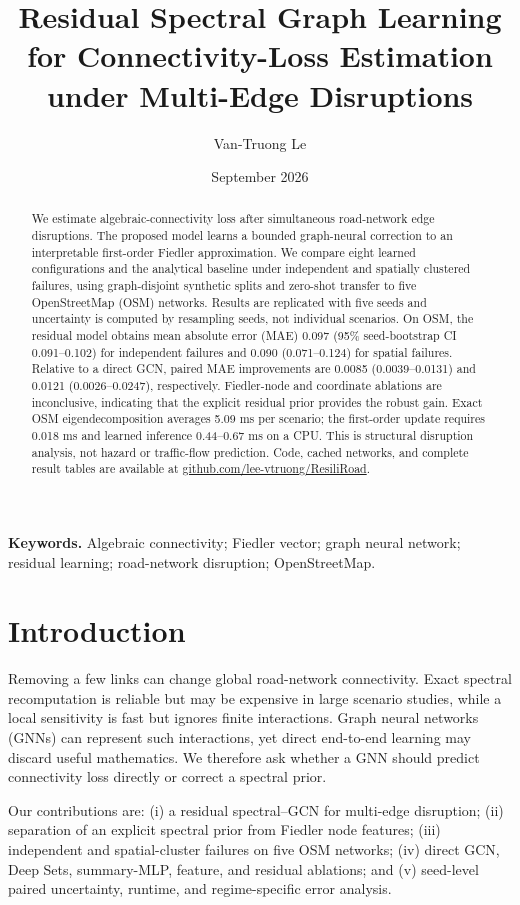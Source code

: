 \documentclass[11pt]{amsart}
\title[Residual spectral graph learning]{Residual Spectral Graph Learning for Connectivity-Loss Estimation under Multi-Edge Disruptions}
\author{Van-Truong Le}
\date{September 2026}
\begin{document}
\begin{abstract}
We estimate algebraic-connectivity loss after simultaneous road-network edge
disruptions. The proposed model learns a bounded graph-neural correction to an
interpretable first-order Fiedler approximation. We compare eight learned
configurations and the analytical baseline under independent and spatially
clustered failures, using graph-disjoint synthetic splits and zero-shot transfer
to five OpenStreetMap (OSM) networks. Results are replicated with five seeds and
uncertainty is computed by resampling seeds, not individual scenarios. On OSM,
the residual model obtains mean absolute error (MAE) 0.097 (95\% seed-bootstrap
CI 0.091--0.102) for independent failures and 0.090 (0.071--0.124) for spatial
failures. Relative to a direct GCN, paired MAE improvements are 0.0085
(0.0039--0.0131) and 0.0121 (0.0026--0.0247), respectively. Fiedler-node and
coordinate ablations are inconclusive, indicating that the explicit residual
prior provides the robust gain. Exact OSM eigendecomposition averages 5.09 ms
per scenario; the first-order update requires 0.018 ms and learned inference
0.44--0.67 ms on a CPU. This is structural disruption analysis, not hazard or
traffic-flow prediction.
Code, cached networks, and complete result tables are available at
\href{https://github.com/lee-vtruong/ResiliRoad}{github.com/lee-vtruong/ResiliRoad}.
\end{abstract}
\maketitle
\noindent\textbf{Keywords.} Algebraic connectivity; Fiedler vector; graph neural
network; residual learning; road-network disruption; OpenStreetMap.
\vspace{1.1em}

\section{Introduction}
Removing a few links can change global road-network connectivity. Exact
spectral recomputation is reliable but may be expensive in large scenario
studies, while a local sensitivity is fast but ignores finite interactions.
Graph neural networks (GNNs) can represent such interactions, yet direct
end-to-end learning may discard useful mathematics. We therefore ask whether a
GNN should predict connectivity loss directly or correct a spectral prior.

Our contributions are: (i) a residual spectral--GCN for multi-edge disruption;
(ii) separation of an explicit spectral prior from Fiedler node features;
(iii) independent and spatial-cluster failures on five OSM networks; (iv)
direct GCN, Deep Sets, summary-MLP, feature, and residual ablations; and (v)
seed-level paired uncertainty, runtime, and regime-specific error analysis.
\end{document}
